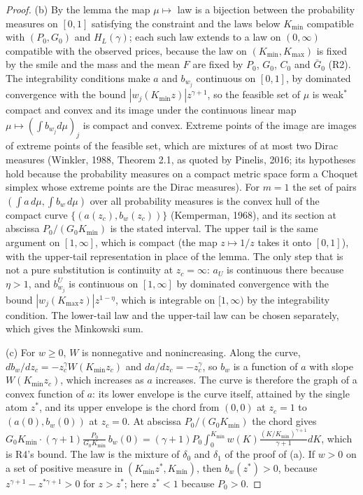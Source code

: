\documentclass[11pt]{article}
\theoremstyle{remark}
\begin{document}
\begin{proof}
(b) By the lemma the map $\mu\mapsto$ law is a bijection between the probability measures on $[0,1]$ satisfying the constraint and the laws below $K_{\min}$ compatible with $(P_0,G_0)$ and $H_L(\gamma)$; each such law extends to a law on $(0,\infty)$ compatible with the observed prices, because the law on $(K_{\min},K_{\max})$ is fixed by the smile and the mass and the mean $F$ are fixed by $P_0$, $G_0$, $C_0$ and $\bar G_0$ (R2). The integrability conditions make $a$ and $b_{w_j}$ continuous on $[0,1]$, by dominated convergence with the bound $|w_j(K_{\min}z)|z^{\gamma+1}$, so the feasible set of $\mu$ is weak$^*$ compact and convex and its image under the continuous linear map $\mu\mapsto(\int b_{w_j}d\mu)_j$ is compact and convex. Extreme points of the image are images of extreme points of the feasible set, which are mixtures of at most two Dirac measures (Winkler, 1988, Theorem 2.1, as quoted by Pinelis, 2016; its hypotheses hold because the probability measures on a compact metric space form a Choquet simplex whose extreme points are the Dirac measures). For $m=1$ the set of pairs $(\int a\,d\mu,\int b_w\,d\mu)$ over all probability measures is the convex hull of the compact curve $\{(a(z_c),b_w(z_c))\}$ (Kemperman, 1968), and its section at abscissa $P_0/(G_0K_{\min})$ is the stated interval. The upper tail is the same argument on $[1,\infty]$, which is compact (the map $z\mapsto1/z$ takes it onto $[0,1]$), with the upper-tail representation in place of the lemma. The only step that is not a pure substitution is continuity at $z_c=\infty$: $a_U$ is continuous there because $\eta>1$, and $b^U_{w_j}$ is continuous on $[1,\infty]$ by dominated convergence with the bound $|w_j(K_{\max}z)|z^{1-\eta}$, which is integrable on $[1,\infty)$ by the integrability condition. The lower-tail law and the upper-tail law can be chosen separately, which gives the Minkowski sum.

(c) For $w\ge0$, $W$ is nonnegative and nonincreasing. Along the curve, $db_w/dz_c=-z_c^\gamma W(K_{\min}z_c)$ and $da/dz_c=-z_c^\gamma$, so $b_w$ is a function of $a$ with slope $W(K_{\min}z_c)$, which increases as $a$ increases. The curve is therefore the graph of a convex function of $a$: its lower envelope is the curve itself, attained by the single atom $z^*$, and its upper envelope is the chord from $(0,0)$ at $z_c=1$ to $(a(0),b_w(0))$ at $z_c=0$. At abscissa $P_0/(G_0K_{\min})$ the chord gives $G_0K_{\min}\cdot(\gamma+1)\frac{P_0}{G_0K_{\min}}\,b_w(0)=(\gamma+1)P_0\int_0^{K_{\min}}w(K)\frac{(K/K_{\min})^{\gamma+1}}{\gamma+1}dK$, which is R4's bound. The law is the mixture of $\delta_0$ and $\delta_1$ of the proof of (a). If $w>0$ on a set of positive measure in $(K_{\min}z^*,K_{\min})$, then $b_w(z^*)>0$, because $z^{\gamma+1}-z^{*\gamma+1}>0$ for $z>z^*$; here $z^*<1$ because $P_0>0$.


\end{proof}
\end{document}
